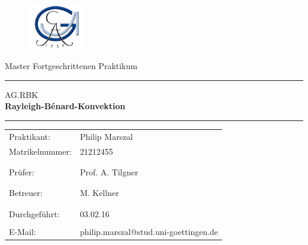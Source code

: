 \documentclass[a4paper, 12pt, ngerman]{article}
\begin{document}
 \begin{titlepage}
 \begin{figure}[t]
 \includegraphics[height=2cm]{georg} \hfill
 \end{figure}

\normalsize
\vspace{1cm}

\begin{center}
\Large Master Fortgeschrittenen Praktikum \\ \vspace{1cm}
\hrule \vspace{3mm}
\large {AG.RBK} \\
\Huge{\bf Rayleigh-B\'enard-Konvektion}
\vspace{5mm}
\hrule
\end{center}

\normalsize


\begin{table}[!h]
\begin{center}

  \begin{tabular}{ll}
  Praktikant: &Philip Marszal\\
	  Matrikelnummer: &21212455\\
	      &\\
   &\\
  Prüfer: & Prof. A. Tilgner\\
	&\\
	&\\
  Betreuer: & M. Kellner\\
  &\\
  &\\
	  Durchgeführt: & 03.02.16\\

\vspace{1cm}& \\
  E-Mail: & \ttfamily philip.marszal@stud.uni-goettingen.de\\
\end{tabular}
\end{center}
\end{table}
\end{titlepage}
\newpage
\thispagestyle{empty}
\mbox{}
\thispagestyle{empty}
\newpage
\thispagestyle{empty}
\tableofcontents
\newpage
\end{document}
